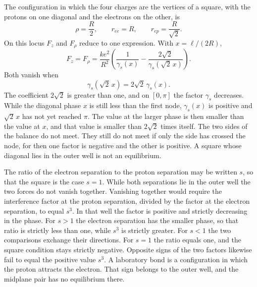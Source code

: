 \documentclass[a4paper]{article}
\begin{document}
The configuration in which the four charges are the vertices of a square, with the protons on one diagonal and the electrons on the other, is
\begin{equation}
\label{eq:square}
\rho=\frac{R}{2},
\qquad
r_{ee}=R,
\qquad
r_{ep}=\frac{R}{\sqrt{2}}.
\end{equation}
On this locus \(F_z\) and \(F_{\rho}\) reduce to one expression. With \(x=\ell/(2R)\),
\begin{equation}
\label{eq:squareF}
F_z=F_{\rho}
  =\frac{k e^{2}}{R^{2}}
  \left(
    \frac{1}{\gamma_s(x)}
    -\frac{2\sqrt{2}}{\gamma_s(\sqrt{2}\,x)}
  \right).
\end{equation}
Both vanish when
\begin{equation}
\label{eq:squarecond}
\gamma_s(\sqrt{2}\,x)=2\sqrt{2}\,\gamma_s(x).
\end{equation}
The coefficient \(2\sqrt{2}\) is greater than one, and on \([0,\pi]\) the factor \(\gamma_s\) decreases. While the diagonal phase \(x\) is still less than the first node, \(\gamma_s(x)\) is positive and \(\sqrt{2}\,x\) has not yet reached \(\pi\). The value at the larger phase is then smaller than the value at \(x\), and that value is smaller than \(2\sqrt{2}\) times itself. The two sides of the balance do not meet. They still do not meet if only the side has crossed the node, for then one factor is negative and the other is positive. A square whose diagonal lies in the outer well is not an equilibrium.

The ratio of the electron separation to the proton separation may be written \(s\), so that the square is the case \(s=1\). While both separations lie in the outer well the two forces do not vanish together. Vanishing together would require the interference factor at the proton separation, divided by the factor at the electron separation, to equal \(s^{3}\). In that well the factor is positive and strictly decreasing in the phase. For \(s>1\) the electron separation has the smaller phase, so that ratio is strictly less than one, while \(s^{3}\) is strictly greater. For \(s<1\) the two comparisons exchange their directions. For \(s=1\) the ratio equals one, and the square condition stays strictly negative. Opposite signs of the two factors likewise fail to equal the positive value \(s^{3}\). A laboratory bond is a configuration in which the proton attracts the electron. That sign belongs to the outer well, and the midplane pair has no equilibrium there.
\end{document}
